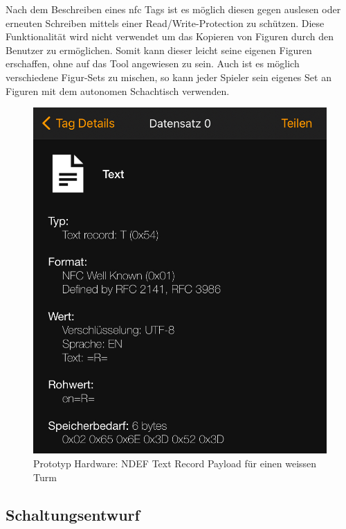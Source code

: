 Nach dem Beschreiben eines \gls{nfc} Tags ist es möglich diesen gegen
auslesen oder erneuten Schreiben mittels einer Read/Write-Protection zu
schützen. Diese Funktionalität wird nicht verwendet um das Kopieren von
Figuren durch den Benutzer zu ermöglichen. Somit kann dieser leicht
seine eigenen Figuren erschaffen, ohne auf das Tool angewiesen zu sein.
Auch ist es möglich verschiedene Figur-Sets zu mischen, so kann jeder
Spieler sein eigenes Set an Figuren mit dem autonomen Schachtisch
verwenden.

\begin{figure}
\centering
\includegraphics{images/ndef_record_rook.png}
\caption{Prototyp Hardware: NDEF Text Record Payload für einen weissen
Turm \label{ndef_record_rook}}
\end{figure}

\hypertarget{schaltungsentwurf}{%
\subsection{Schaltungsentwurf}\label{schaltungsentwurf}}

